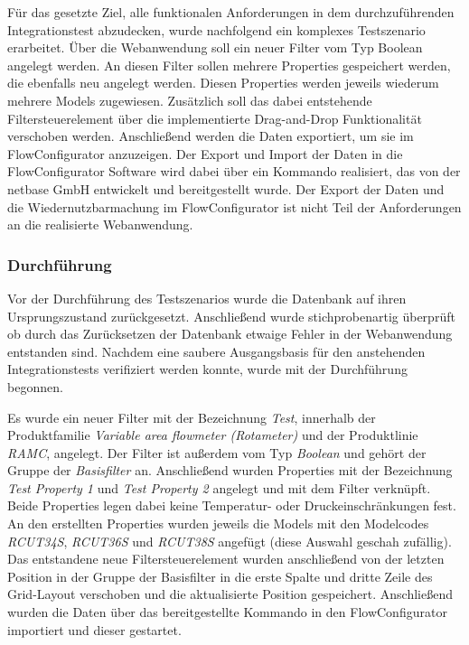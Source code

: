 Für das gesetzte Ziel, alle funktionalen Anforderungen in dem durchzuführenden Integrationstest abzudecken, wurde nachfolgend ein komplexes Testszenario erarbeitet.
Über die Webanwendung soll ein neuer Filter vom Typ Boolean angelegt werden. An diesen Filter sollen mehrere Properties gespeichert werden, die ebenfalls neu angelegt werden. Diesen Properties werden jeweils wiederum mehrere Models zugewiesen. Zusätzlich soll das dabei entstehende Filtersteuerelement über die implementierte Drag-and-Drop Funktionalität verschoben werden. Anschließend werden die Daten exportiert, um sie im FlowConfigurator anzuzeigen. Der Export und Import der Daten in die FlowConfigurator Software wird dabei über ein Kommando realisiert, das von der netbase GmbH entwickelt und bereitgestellt wurde. Der Export der Daten und die Wiedernutzbarmachung im FlowConfigurator ist nicht Teil der Anforderungen an die realisierte Webanwendung.

\subsubsection{Durchführung}

Vor der Durchführung des Testszenarios wurde die Datenbank auf ihren Ursprungszustand zurückgesetzt. Anschließend wurde stichprobenartig überprüft ob durch das Zurücksetzen der Datenbank etwaige Fehler in der Webanwendung entstanden sind. Nachdem eine saubere Ausgangsbasis für den anstehenden Integrationstests verifiziert werden konnte, wurde mit der Durchführung begonnen.

Es wurde ein neuer Filter mit der Bezeichnung \emph{Test}, innerhalb der Produktfamilie \emph{Variable area flowmeter (Rotameter)} und der Produktlinie \emph{RAMC}, angelegt. Der Filter ist außerdem vom Typ \emph{Boolean} und gehört der Gruppe der \emph{Basisfilter} an. Anschließend wurden Properties mit der Bezeichnung \emph{Test Property 1} und \emph{Test Property 2} angelegt und mit dem Filter verknüpft. Beide Properties legen dabei keine Temperatur- oder Druckeinschränkungen fest. An den erstellten Properties wurden jeweils die Models mit den Modelcodes \emph{RCUT34S}, \emph{RCUT36S} und \emph{RCUT38S} angefügt (diese Auswahl geschah zufällig). Das entstandene neue Filtersteuerelement wurden anschließend von der letzten Position in der Gruppe der Basisfilter in die erste Spalte und dritte Zeile des Grid-Layout verschoben und die aktualisierte Position gespeichert. Anschließend wurden die Daten über das bereitgestellte Kommando in den FlowConfigurator importiert und dieser gestartet.

